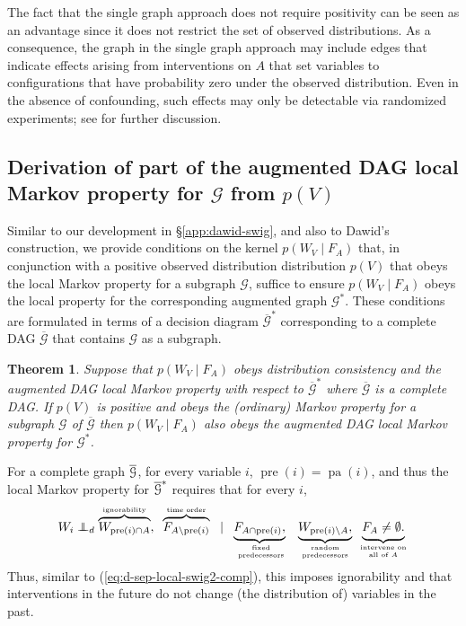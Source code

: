\documentclass[11pt]{article}
\DeclareMathOperator{\pa}{pa}
\DeclareMathOperator{\pre}{pre}
\newtheorem{theorem}{Theorem}
\newcommand{\G}{{\mathscr G}}
\newcommand\indepd{\protect\mathpalette{\protect\independenTd}{\perp}}
\def\independenTd#1#2{\mathrel{\rlap{$#1#2$}\mkern2.5mu{#1#2}_d}}
\begin{document}
{The fact that the single graph approach does not require positivity can be seen as an advantage since
it does not restrict the set of observed distributions. As a consequence, the graph in the single graph approach may include edges that indicate effects arising from interventions on $A$ that set variables to configurations that have probability zero under the observed distribution. Even in the absence of confounding, such effects may only be detectable via randomized experiments; see \cite{robins:mediation:2020} for further discussion.

\subsection{Derivation of part of the augmented DAG local Markov property for $\G$ from $p(V)$}

Similar to our development in \S \ref{app:dawid-swig}, and also to Dawid's construction, we provide conditions on the kernel $p(W_V \mid F_A)$ that, in conjunction with 
a positive observed distribution distribution  
$p(V)$ that obeys the local Markov property for a subgraph $\G$, suffice to ensure $p(W_V \mid F_A)$
obeys the local property for the corresponding augmented graph ${\G}^*$. These conditions are formulated in terms of a decision diagram $\overline{\G}^*$
corresponding to a complete DAG  $\overline{\G}$ that contains $\G$ as a subgraph.

\begin{theorem}
Suppose that $p(W_V \mid F_A)$ obeys distribution consistency and the augmented DAG local Markov property with respect to $\overline{\G}^*$ where $\overline{\G}$ is a complete DAG. If $p(V)$ is positive and obeys the (ordinary) Markov property for a subgraph $\G$ of $\overline{\G}$ then 
$p(W_V \mid F_A)$ also obeys the augmented DAG local Markov property for ${\G}^*$.
\end{theorem}


For a complete graph $\overline{\cal G}$, for every variable $i$, $\pre(i) = \pa(i)$, and thus the
 local Markov property for $\overline{\cal G}^*$ requires that for every $i$,
\begin{align}\label{eq:d-sep-local-swig2-comp-aug}
W_i  \indepd 
 \overbrace{W_{\pre(i) \cap A}}^{\hbox{\tiny ignorability}},\;\;
 \overbrace{\vphantom{W}F_{A\setminus \pre(i)}}^{\hbox{\tiny time order}}\;\;   
\mid 
\underbrace{F_{A \cap \pre(i)},}_{\hbox{\tiny~~ \parbox{40pt}{\centering fixed predecessors}~~}}
\underbrace{W_{\pre(i) \setminus A},}_{\hbox{\tiny ~~\parbox{40pt}{\centering random predecessors}~~}}
\underbrace{F_{A\vphantom{\mid}} \neq \emptyset.}_{\hbox{\tiny \parbox{40pt}{\centering intervene on all of $A$}}}%
 \end{align}
 Thus, similar to (\ref{eq:d-sep-local-swig2-comp}), this imposes ignorability and that interventions in the future do not change (the distribution of) variables in the past. 
 \bigskip
 
}
\end{document}
